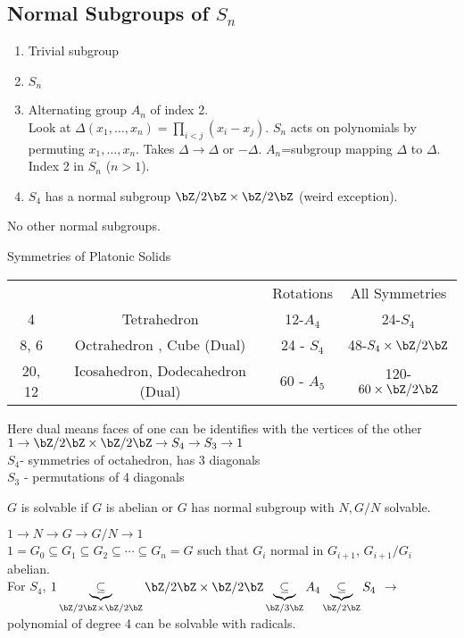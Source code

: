 
\subsection{Normal Subgroups of $S_n$} 
\begin{enumerate}
    \item Trivial subgroup 
    \item $S_n$ 
    \item Alternating group $A_n$ of index 2. \\
    Look at $\Delta(x_1, \ldots, x_n) = \prod_{i < j}(x_i-x_j)$. $S_n$ acts on polynomials by permuting $x_1, \ldots, x_n$. Takes $\Delta \to \Delta$ or $-\Delta$. $A_n$=subgroup mapping $\Delta$ to $\Delta$. Index 2 in $S_n$ ($n>1$). 
    \item $S_4$ has a normal subgroup $\bZ/2\bZ \times \bZ/2\bZ$ (weird exception). 
\end{enumerate}

\noindent
No other normal subgroups. 

\noindent
Symmetries of Platonic Solids

\begin{tabular}{c c c c}
    & & Rotations & All Symmetries \\
    4 & Tetrahedron & 12-$A_4$ & 24-$S_4$ \\
    8, 6 & Octrahedron , Cube (Dual) & 24 - $S_4$ & 48-$S_4 \times \bZ/2\bZ$ \\
    20, 12 & Icosahedron, Dodecahedron (Dual) & 60 - $A_5$ & 120-$60 \times \bZ/2\bZ$ 
\end{tabular}

\noindent
Here dual means faces of one can be identifies with the vertices of the other \\

\noindent
$1 \to \bZ/2\bZ \times \bZ/2\bZ \to S_4 \to S_3 \to 1$ \\
$S_4$- symmetries of octahedron, has 3 diagonals \\
$S_3$ - permutations of 4 diagonals \\
\begin{definition}
    $G$ is solvable if $G$ is abelian or $G$ has normal subgroup with $N, G/N$ solvable. \\
\end{definition}

\noindent
$1 \to N \to G \to G/N \to 1$ \\
$1 = G_0 \subseteq G_1 \subseteq G_2 \subseteq \cdots \subseteq G_n = G$ such that $G_i$ normal in $G_{i+1}$, $G_{i+1}/G_i$ abelian. \\
For $S_4$, $1 \underbrace{\subseteq}_{\bZ/2\bZ \times \bZ/2\bZ} \bZ/2\bZ \times \bZ/2\bZ \underbrace{ \subseteq}_{\bZ/3\bZ} A_4 \underbrace{\subseteq}_{\bZ/2\bZ} S_4$ $\to$ polynomial of degree 4 can be solvable with radicals. 

